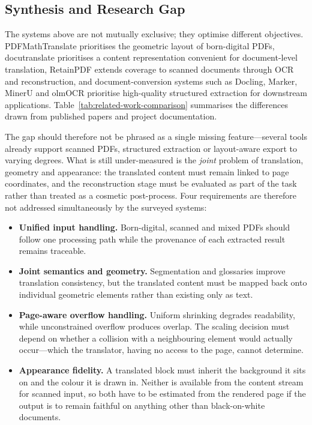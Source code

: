 \subsection{Synthesis and Research Gap}
\label{subsec:lit-gap}

The systems above are not mutually exclusive; they optimise different
objectives. PDFMathTranslate prioritises the geometric layout of born-digital
PDFs, docutranslate prioritises a content representation convenient for
document-level translation, RetainPDF extends coverage to scanned documents
through OCR and reconstruction, and document-conversion systems such as
Docling, Marker, MinerU and olmOCR prioritise high-quality structured extraction
for downstream applications. Table~\ref{tab:related-work-comparison} summarises
the differences drawn from published papers and project documentation.

The gap should therefore not be phrased as a single missing feature---several
tools already support scanned PDFs, structured extraction or layout-aware export
to varying degrees. What is still under-measured is the \emph{joint} problem of
translation, geometry and appearance: the translated content must remain linked
to page coordinates, and the reconstruction stage must be evaluated as part of
the task rather than treated as a cosmetic post-process. Four requirements are
therefore not addressed simultaneously by the surveyed systems:

\begin{itemize}[leftmargin=1.2em]
  \item \textbf{Unified input handling.} Born-digital, scanned and mixed PDFs
  should follow one processing path while the provenance of each extracted
  result remains traceable.
  \item \textbf{Joint semantics and geometry.} Segmentation and glossaries
  improve translation consistency, but the translated content must be mapped
  back onto individual geometric elements rather than existing only as text.
  \item \textbf{Page-aware overflow handling.} Uniform shrinking degrades
  readability, while unconstrained overflow produces overlap. The scaling
  decision must depend on whether a collision with a neighbouring element would
  actually occur---which the translator, having no access to the page, cannot
  determine.
  \item \textbf{Appearance fidelity.} A translated block must inherit the
  background it sits on and the colour it is drawn in. Neither is available from
  the content stream for scanned input, so both have to be estimated from the
  rendered page if the output is to remain faithful on anything other than
  black-on-white documents.
\end{itemize}

